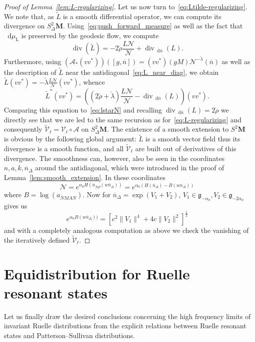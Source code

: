 \documentclass[10pt]{amsart}
\theoremstyle{definition}
\DeclareMathOperator{\Div}{div}
\newcommand{\rml}{\mathrm{L}}
\newcommand{\mc}{\mathcal}
\newcommand{\bfm}{\mathbf{M}}
\newcommand{\til}{\widetilde}
\newcommand{\intd}{\mathop{}\!\mathrm{d}}
\newcommand{\g}{\mathfrak g}
\newcommand{\bn}{{\overline{n}}}
\newcommand{\bN}{{\overline{N}}}
\begin{document}
\begin{proof}[Proof of Lemma~\ref{lem:L-regularizing}]
Let us now turn to~\eqref{eq:Ltilde-regularizing}. We note that, as $\til L$ is a smooth differential operator, we can compute its divergence on $S^2_\Delta\mathbf M$. Using~\eqref{eq:push_forward_measure} as well as the fact that $\intd \mu_{\rml}$ is preserved by the geodesic flow, we compute
\[
\Div\left(\til L\right) = -2\check\rho\frac{L\mc{N}}{\mc{N}} + \Div_{\intd \bn}(L).
\]
Furthermore, using $(\mathcal A_*(vv^*))([g,\bn]) = (vv^ *)(gM) \mc{N}^{-\check \lambda}(\bn)$ as well as the description of $\til L$ near the antidiagonal~\eqref{eq:L_near_diag}, we obtain $\til L (vv^*) = -\check\lambda \frac{L\mc{N}}{\mc{N}} (vv^*)$, whence
\[
\til L^*(vv^*) = \left(\left(2\check \rho+\check \lambda\right)\frac{L\mc{N}}{\mc{N}} -
\Div_{\intd \bn}(L)\right)(vv^*).
\]
Comparing this equation to~\eqref{eq:lstarN} and recalling $\Div_{\intd \bn}(L)=2\check\rho$ we directly see that we are led to the same recursion as for~\eqref{eq:L-regularizing} and consequently $\til{\mc V}_\ell = \mc V_\ell\circ\mc A$ on $S^2_\Delta{\bfm}$. The existence of a smooth extension to $S^2\bfm$ is obvious by the following global argument: $\til L$ is a smooth vector field thus its divergence is a smooth function, and all $\til{\mathcal V}_{\ell}$ are built out of derivatives of this divergence. The smoothness can, however, also be seen in the coordinates $n,a, k,\bn_\Delta$ around the antidiagonal, which were introduced in the proof of Lemma~\ref{lem:smooth_extension}. In these coordinates
\[
\mc{N} = e^{\alpha_0 H(\bn_{\bN P}(w\bn_\Delta))} = e^{\alpha_0 (H(\bn_\Delta) - B(w\bn_\Delta))}
\]
where $B=\log(a_{\bN MAN})$. Now for $\bn_\Delta = \exp(V_1+V_2)$, $V_1\in\g_{-\alpha_0}, V_2\in\g_{-2\alpha_0}$~\cite[Theorem~IX.3.8]{Hel78} gives us
\[
e^{\alpha_0 B(w\bn_\Delta))} = \left[c^2\|V_1\|^4 + 4c\|V_2\|^2\right]^{\frac{1}{2}}
\]
and with a completely analogous computation as above we check the vanishing of the iteratively defined $\til{\mathcal V}_{\ell}$.
\end{proof}



\section{Equidistribution for Ruelle resonant states}
Let us finally draw the desired conclusions concerning the high frequency limits of invariant Ruelle distributions from the explicit relations between Ruelle resonant states and Patterson--Sullivan distributions.
\end{document}
